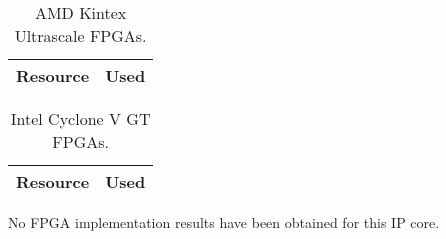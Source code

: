 \ifdefined\FPGA

\ifdefined\XILINX
\begin{table}[H]
\centering
\begin{tabular}{|l|r|}
\hline
\rowcolor{iob-green}
\textbf{Resource}  & \textbf{Used} \\
\hline
\hline
 
\end{tabular}
\caption{AMD Kintex Ultrascale FPGAs.}
\label{tab:fpga_amd}
\end{table}
\fi


\ifdefined\INTEL
\begin{table}[H]
\centering
\begin{tabular}{|l|r|}
\hline
\rowcolor{iob-green}
\textbf{Resource}  & \textbf{Used} \\
\hline
\hline
 
\end{tabular}
\caption{Intel Cyclone V GT FPGAs.}
\label{tab:fpga_intel}
\end{table}
\else
No FPGA implementation results have been obtained for this IP core.
\fi

\fi
